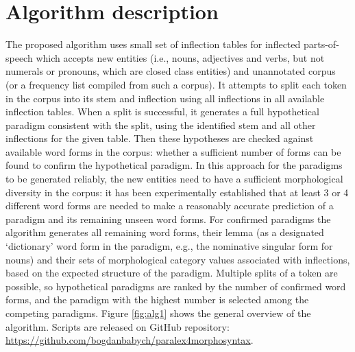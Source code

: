 \documentclass[11pt,a4paper]{article}
\begin{document}
\section{Algorithm description}
\label{sec:Algorithm}

The proposed algorithm uses small set of inflection tables for inflected parts-of-speech which accepts new entities (i.e., nouns, adjectives and verbs, but not numerals or pronouns, which are closed class entities) and unannotated corpus (or a frequency list compiled from such a corpus). It attempts to split each token in the corpus into its stem and inflection using all inflections in all available inflection tables. When a split is successful, it generates a full hypothetical paradigm consistent with the split, using the identified stem and all other inflections for the given table. Then these hypotheses are checked against available word forms in the corpus: whether a sufficient number of forms can be found to confirm the hypothetical paradigm. In this approach for the paradigms to be generated reliably, the new entities need to have a sufficient morphological diversity in the corpus: it has been experimentally established that at least 3 or 4 different word forms are needed to make a reasonably accurate prediction of a paradigm and its remaining unseen word forms. For confirmed paradigms the algorithm generates all remaining word forms, their lemma (as a designated `dictionary' word form in the paradigm, e.g., the nominative singular form for nouns) and their sets of morphological category values associated with inflections, based on the expected structure of the paradigm. Multiple splits of a token are possible, so hypothetical paradigms are ranked by the number of confirmed word forms, and the paradigm with the highest number is selected among the competing paradigms. Figure \ref{fig:alg1} shows the general overview of the algorithm. Scripts are released on GitHub repository: \url{https://github.com/bogdanbabych/paralex4morphosyntax}.
\end{document}
